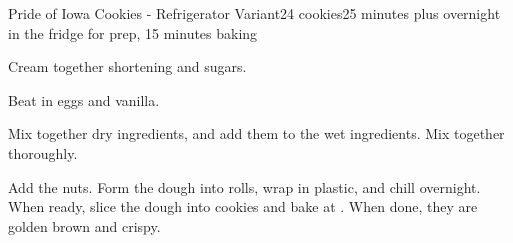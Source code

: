 \documentclass[../Cookbook.tex]{subfiles}
\begin{document}
\begin{recipe}{Pride of Iowa Cookies - Refrigerator Variant}{24 cookies}{25 minutes plus overnight in the fridge for prep, 15 minutes baking}

	Cream together shortening and sugars.

	Beat in eggs and vanilla.

	Mix together dry ingredients, and add them to the wet ingredients. Mix together thoroughly.

	Add the nuts. Form the dough into rolls, wrap in plastic, and chill overnight.\\
	When ready, slice the dough into cookies and bake at . When done, they are golden brown and crispy.

\end{recipe}
\end{document}
